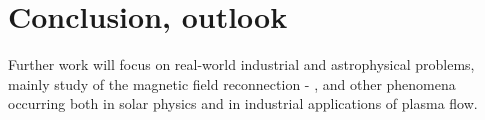 \chapter{Conclusion, outlook}
Further work will focus on real-world industrial and astrophysical problems, mainly study of the magnetic field reconnection - \cite{reconnection}, and other phenomena occurring both in solar physics and in industrial applications of plasma flow.